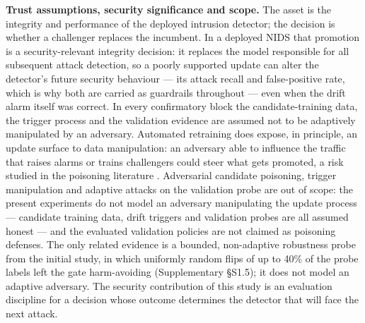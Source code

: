 \documentclass[a4paper,fleqn]{cas-sc}
\begin{document}
\textbf{Trust assumptions, security significance and scope.} The asset is the integrity and performance of the deployed intrusion detector; the decision is whether a challenger replaces the incumbent. In a deployed NIDS that promotion is a security-relevant integrity decision: it replaces the model responsible for all subsequent attack detection, so a poorly supported update can alter the detector's future security behaviour --- its attack recall and false-positive rate, which is why both are carried as guardrails throughout --- even when the drift alarm itself was correct. In every confirmatory block the candidate-training data, the trigger process and the validation evidence are assumed not to be adaptively manipulated by an adversary. Automated retraining does expose, in principle, an update surface to data manipulation: an adversary able to influence the traffic that raises alarms or trains challengers could steer what gets promoted, a risk studied in the poisoning literature \cite{biggio2012poisoning}. Adversarial candidate poisoning, trigger manipulation and adaptive attacks on the validation probe are out of scope: the present experiments do not model an adversary manipulating the update process --- candidate training data, drift triggers and validation probes are all assumed honest --- and the evaluated validation policies are not claimed as poisoning defenses. The only related evidence is a bounded, non-adaptive robustness probe from the initial study, in which uniformly random flips of up to 40\% of the probe labels left the gate harm-avoiding (Supplementary \S S1.5); it does not model an adaptive adversary. The security contribution of this study is an evaluation discipline for a decision whose outcome determines the detector that will face the next attack.
\end{document}
